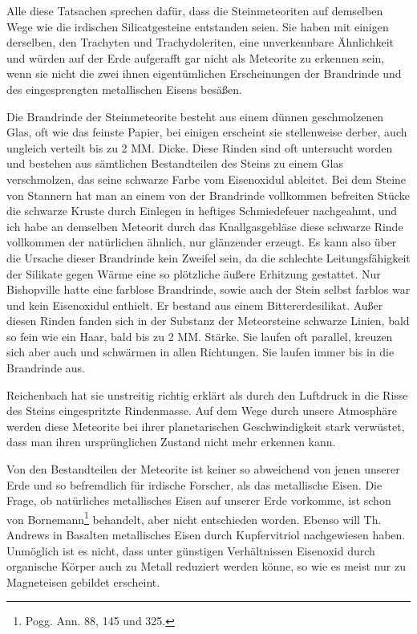 \documentclass[a4paper, 11pt, oneside, german]{article}
\begin{document}
Alle diese Tatsachen sprechen dafür, dass die Steinmeteoriten auf demselben Wege wie die irdischen Silicatgesteine entstanden seien. Sie haben mit einigen derselben, den Trachyten und Trachydoleriten, eine unverkennbare Ähnlichkeit und würden auf der Erde aufgerafft gar nicht als Meteorite zu erkennen sein, wenn sie nicht die zwei ihnen eigentümlichen Erscheinungen der Brandrinde und des eingesprengten metallischen Eisens besäßen.

Die Brandrinde der Steinmeteorite besteht aus einem dünnen geschmolzenen Glas, oft wie das feinste Papier, bei einigen erscheint sie stellenweise derber, auch ungleich verteilt bis zu 2 MM. Dicke. Diese Rinden sind oft untersucht worden und bestehen aus sämtlichen Bestandteilen des Steins zu einem Glas verschmolzen, das seine schwarze Farbe vom Eisenoxidul ableitet. Bei dem Steine von Stannern hat man an einem von der Brandrinde vollkommen befreiten Stücke die schwarze Kruste durch Einlegen in heftiges Schmiedefeuer nachgeahmt, und ich habe an demselben Meteorit durch das Knallgasgebläse diese schwarze Rinde vollkommen der natürlichen ähnlich, nur glänzender erzeugt. Es kann also über die Ursache dieser Brandrinde kein Zweifel sein, da die schlechte Leitungsfähigkeit der Silikate gegen Wärme eine so plötzliche äußere Erhitzung gestattet. Nur Bishopville hatte eine farblose Brandrinde, sowie auch der Stein selbst farblos war und kein Eisenoxidul enthielt. Er bestand aus einem Bittererdesilikat. Außer diesen Rinden fanden sich in der Substanz der Meteorsteine schwarze Linien, bald so fein wie ein Haar, bald bis zu 2 MM. Stärke. Sie laufen oft parallel, kreuzen sich aber auch und schwärmen in allen Richtungen. Sie laufen immer bis in die Brandrinde aus.

Reichenbach hat sie unstreitig richtig erklärt als durch den Luftdruck in die Risse des Steins eingespritzte Rindenmasse. Auf dem Wege durch unsere Atmosphäre werden diese Meteorite bei ihrer planetarischen Geschwindigkeit stark verwüstet, dass man ihren ursprünglichen Zustand nicht mehr erkennen kann.

Von den Bestandteilen der Meteorite ist keiner so abweichend von jenen unserer Erde und so befremdlich für irdische Forscher, als das metallische Eisen. Die Frage, ob natürliches metallisches Eisen auf unserer Erde vorkomme, ist schon von Bornemann\footnote{Pogg. Ann. 88, 145 und 325.} behandelt, aber nicht entschieden worden. Ebenso will Th. Andrews in Basalten metallisches Eisen durch Kupfervitriol nachgewiesen haben. Unmöglich ist es nicht, dass unter günstigen Verhältnissen Eisenoxid durch organische Körper auch zu Metall reduziert werden könne, so wie es meist nur zu Magneteisen gebildet erscheint.
\end{document}
